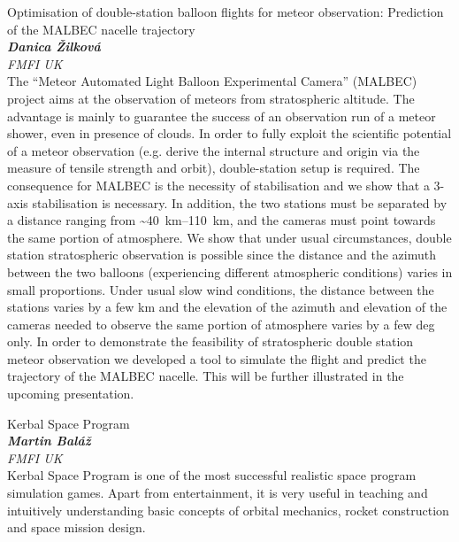 \documentclass[a4paper]{report}
\begin{document}
                    \begin{tcolorbox}[
                                    colback=white,
                    colframe=black!70!white,
                                fonttitle=\Large\bfseries,
                title=17:30
            ]
                {\Large Optimisation of double-station balloon flights for meteor observation: Prediction of the MALBEC nacelle trajectory}
                                                            \\ \textbf{\textit{Danica Žilková}}
                                                    \\ \textit{FMFI UK}                \\[2ex]The “Meteor Automated Light Balloon Experimental Camera” (MALBEC) project aims at the observation of meteors from stratospheric altitude. The advantage is mainly to guarantee the success of an observation run of a meteor shower, even in presence of clouds. In order to fully exploit the scientific potential of a meteor observation (e.g. derive the internal structure and origin via the measure of tensile strength and orbit), double-station setup is required. The consequence for MALBEC is the necessity of stabilisation and we show that a 3-axis stabilisation is necessary. In addition, the two stations must be separated by a distance ranging from \textasciitilde\SIrange{40}{110}{\kilo\metre}, and the cameras must point towards the same portion of atmosphere. We show that under usual circumstances, double station stratospheric observation is possible since the distance and the azimuth between the two balloons (experiencing different atmospheric conditions) varies in small proportions. Under usual slow wind conditions, the distance between the stations varies by a few km and the elevation of the azimuth and elevation of the cameras needed to observe the same portion of atmosphere varies by a few deg only. In order to demonstrate the feasibility of stratospheric double station meteor observation we developed a tool to simulate the flight and predict the trajectory of the MALBEC nacelle. This will be further illustrated in the upcoming presentation.
            \end{tcolorbox}
                    \begin{tcolorbox}[
                                    colback=white,
                    colframe=black!70!white,
                                fonttitle=\Large\bfseries,
                title=18:00
            ]
                {\Large Kerbal Space Program}
                                                            \\ \textbf{\textit{Martin Baláž}}
                                                    \\ \textit{FMFI UK}                \\[2ex]Kerbal Space Program is one of the most successful realistic space program simulation games. Apart from entertainment, it is very useful in teaching and intuitively understanding basic concepts of orbital mechanics, rocket construction and space mission design.
            \end{tcolorbox}
\end{document}
